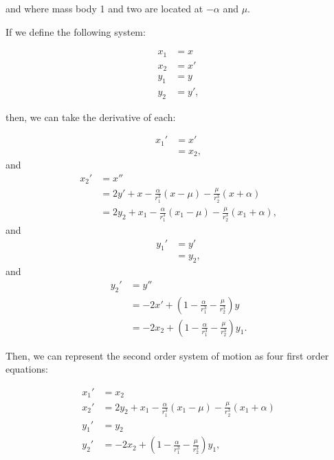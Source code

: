\documentclass{article}
\begin{document}
and where mass body 1 and two are located at $-\alpha$ and $\mu$.

If we define the following system:

\begin{align}
    x_1 &= x \nonumber \\
    x_2 &= x' \nonumber \\
    y_1 &= y \nonumber \\
    y_2 &= y', \label{eq:first_order_def}
\end{align}

then, we can take the derivative of each:

\begin{align*}
    x_1' &= x' \\
    &= x_2,
\end{align*}
and
\begin{align*}
    x_2' &= x'' \\
    &= 2 y' + x
        - \frac{\alpha}{r_1^3} (x - \mu)
        - \frac{\mu}{r_2^3} (x + \alpha) \\
    &= 2 y_2 + x_1 - \frac{\alpha}{r_1^3} (x_1 - \mu)
        - \frac{\mu}{r_2^3} (x_1 + \alpha),
\end{align*}
and
\begin{align*}
    y_1' &= y' \\
    &= y_2,
\end{align*}
and
\begin{align*}
    y_2' &= y'' \\
    &= - 2 x' + \left(
        1 - \frac{\alpha}{r_1^3}
        - \frac{\mu}{r_2^3}
    \right) y \\
    &= - 2 x_2 + \left(
        1 - \frac{\alpha}{r_1^3}
        - \frac{\mu}{r_2^3}
    \right) y_1.
\end{align*}

Then, we can represent the second order system of motion as four first order equations:

\begin{align}
    x_1' &= x_2 \nonumber \\
    x_2' &= 2 y_2 + x_1 - \frac{\alpha}{r_1^3} (x_1 - \mu)
        - \frac{\mu}{r_2^3} (x_1 + \alpha) \nonumber \\
    y_1' &= y_2 \nonumber \\
    y_2' &= - 2 x_2 + \left(
        1 - \frac{\alpha}{r_1^3}
        - \frac{\mu}{r_2^3}
    \right) y_1, \label{eq:reduce_3_body_prog_sys} \\
\end{align}
\end{document}
